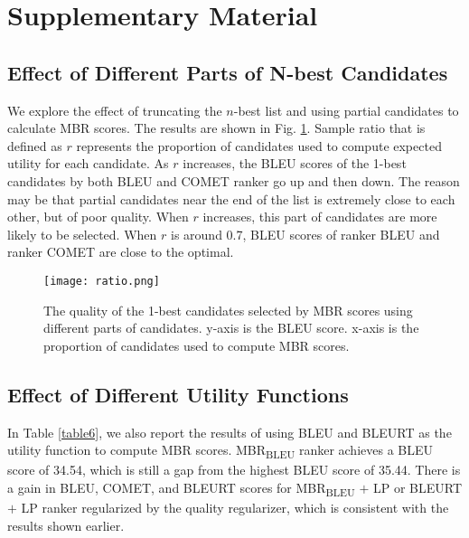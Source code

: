 \documentclass{article}
\begin{document}
\section{Supplementary Material}
\subsection{Effect of Different Parts of N-best Candidates}
We explore the effect of truncating the $n$-best list and using partial candidates to calculate MBR scores. The results are shown in Fig. \ref{f3}. Sample ratio that is defined as $r$ represents the proportion of candidates used to compute expected utility for each candidate. As $r$ increases, the BLEU scores of the 1-best candidates by both BLEU and COMET ranker go up and then down. The reason may be that partial candidates near the end of the list is extremely close to each other, but of poor quality. When $r$ increases, this part of candidates are more likely to be selected. When $r$ is around 0.7, BLEU scores of ranker BLEU and ranker COMET are close to the optimal.

\begin{figure}[htbp]
	\centering 
    \texttt{[image: ratio.png]}
	\caption{The quality of the 1-best candidates selected by MBR scores using different parts of candidates. y-axis is the BLEU score. x-axis is the proportion of candidates used to compute MBR scores.}
	\label{f3}
\end{figure}

\subsection{Effect of Different Utility Functions}
In Table \ref{table6}, we also report the results of using BLEU and BLEURT as the utility function to compute MBR scores. MBR\textsubscript{BLEU} ranker achieves a BLEU score of 34.54, which is still a gap from the highest BLEU score of 35.44. There is a gain in BLEU, COMET, and BLEURT scores for MBR\textsubscript{BLEU} $+$ LP or BLEURT $+$ LP ranker regularized by the quality regularizer, which is consistent with the results shown earlier.
\end{document}
